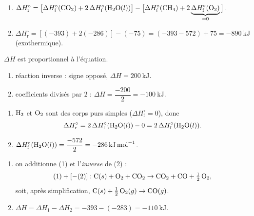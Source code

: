 \documentclass[11pt,a4paper]{article}
\begin{document}
\begin{corrige}
\begin{enumerate}[label=\alph*)]
  \item $\Delta H^\circ_{\text{r}} = \big[\Delta H^\circ_{\text{f}}(\ce{CO2}) + 2\,\Delta H^\circ_{\text{f}}(\ce{H2O}(l))\big] - \big[\Delta H^\circ_{\text{f}}(\ce{CH4}) + 2\underbrace{\Delta H^\circ_{\text{f}}(\ce{O2})}_{=0}\big]$.
  \item $\Delta H^\circ_{\text{r}} = [(-393) + 2(-286)] - (-75) = (-393 - 572) + 75 = \qty{-890}{\kilo\joule}$ (exothermique).
\end{enumerate}
\end{corrige}

\begin{corrige}
$\Delta H$ est proportionnel à l'équation.
\begin{enumerate}[label=\alph*)]
  \item réaction inverse : signe opposé, $\Delta H = \qty{+200}{\kilo\joule}$.
  \item coefficients divisés par $2$ : $\Delta H = \dfrac{-200}{2} = \qty{-100}{\kilo\joule}$.
\end{enumerate}
\end{corrige}

\begin{corrige}
\begin{enumerate}[label=\alph*)]
  \item $\ce{H2}$ et $\ce{O2}$ sont des corps purs simples ($\Delta H^\circ_{\text{f}}=0$), donc
  \[ \Delta H^\circ_{\text{r}} = 2\,\Delta H^\circ_{\text{f}}(\ce{H2O}(l)) - 0 = 2\,\Delta H^\circ_{\text{f}}(\ce{H2O}(l)). \]
  \item $\Delta H^\circ_{\text{f}}(\ce{H2O}(l)) = \dfrac{-572}{2} = \qty{-286}{\kilo\joule\per\mol}$.
\end{enumerate}
\end{corrige}

\begin{corrige}
\begin{enumerate}[label=\alph*)]
  \item on additionne (1) et l'\emph{inverse} de (2) :
  \[ (1) + [-(2)] : \ce{C}(s) + \ce{O2} + \ce{CO2} \rightarrow \ce{CO2} + \ce{CO} + \tfrac12\,\ce{O2}, \]
  soit, après simplification, $\ce{C}(s) + \tfrac12\,\ce{O2}(g) \rightarrow \ce{CO}(g)$.
  \item $\Delta H = \Delta H_1 - \Delta H_2 = -393 - (-283) = \qty{-110}{\kilo\joule}$.
\end{enumerate}
\end{corrige}
\end{document}

